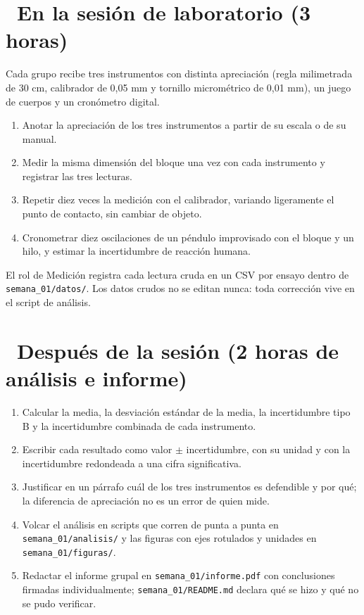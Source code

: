 \documentclass[11pt,a4paper]{article}
\newcommand{\iconotexto}[2]{\textcolor{cyanNeon}{\faIcon{#1}}~#2}
\begin{document}
\section{\iconotexto{flask}{En la sesión de laboratorio (3 horas)}}

Cada grupo recibe tres instrumentos con distinta apreciación (regla milimetrada de 30 cm, calibrador de 0,05 mm y tornillo micrométrico de 0,01 mm), un juego de cuerpos y un cronómetro digital.

\begin{enumerate}[leftmargin=1.6em,itemsep=2pt,topsep=3pt]
  \item Anotar la apreciación de los tres instrumentos a partir de su escala o de su manual.
  \item Medir la misma dimensión del bloque una vez con cada instrumento y registrar las tres lecturas.
  \item Repetir diez veces la medición con el calibrador, variando ligeramente el punto de contacto, sin cambiar de objeto.
  \item Cronometrar diez oscilaciones de un péndulo improvisado con el bloque y un hilo, y estimar la incertidumbre de reacción humana.
\end{enumerate}

\begin{cajaRecuerda}El rol de Medición registra cada lectura cruda en un CSV por ensayo dentro de \texttt{semana\_01/datos/}. Los datos crudos no se editan nunca: toda corrección vive en el script de análisis.\end{cajaRecuerda}

\section{\iconotexto{chart-line}{Después de la sesión (2 horas de análisis e informe)}}

\begin{enumerate}[leftmargin=1.6em,itemsep=2pt,topsep=3pt]
  \item Calcular la media, la desviación estándar de la media, la incertidumbre tipo B y la incertidumbre combinada de cada instrumento.
  \item Escribir cada resultado como valor $\pm$ incertidumbre, con su unidad y con la incertidumbre redondeada a una cifra significativa.
  \item Justificar en un párrafo cuál de los tres instrumentos es defendible y por qué; la diferencia de apreciación no es un error de quien mide.
  \item Volcar el análisis en scripts que corren de punta a punta en \texttt{semana\_01/analisis/} y las figuras con ejes rotulados y unidades en \texttt{semana\_01/figuras/}.
  \item Redactar el informe grupal en \texttt{semana\_01/informe.pdf} con conclusiones firmadas individualmente; \texttt{semana\_01/README.md} declara qué se hizo y qué no se pudo verificar.
\end{enumerate}
\end{document}
